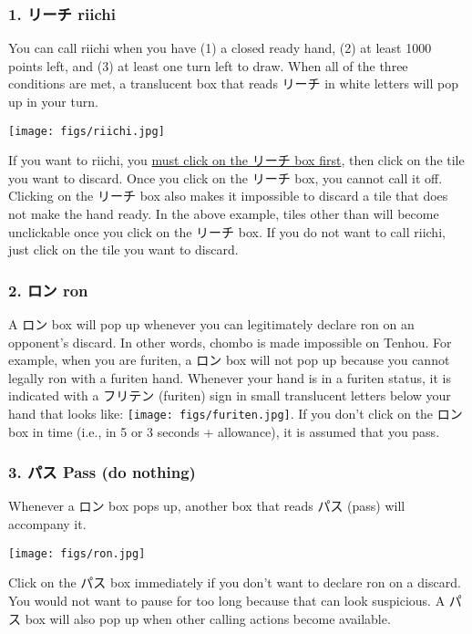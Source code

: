 \subsubsection{1. リーチ riichi } 
You can call riichi when you have (1) a closed ready hand, (2) at least 1000 points left, and (3) at least one turn left to draw. When all of the three conditions are met, a translucent box that reads リーチ in white letters will pop up in your turn. 
\begin{center}
\texttt{[image: figs/riichi.jpg]}
\end{center}
If you want to riichi, you \underline{must click on the リーチ box first}, then click on the tile you want to discard. Once you click on the リーチ box, you cannot call it off. Clicking on the リーチ box also makes it impossible to discard a tile that does not make the hand ready. In the above example, tiles other than {\LARGE {}} will become unclickable once you click on the リーチ box. If you do not want to call riichi, just click on the tile you want to discard. 

\subsubsection{2. ロン {\jap ron} \textipa{[r\'\textopeno\ng]}}
A ロン box will pop up whenever you can legitimately declare {\jap ron} on an opponent's discard. In other words, {\jap chombo} is made impossible on {\jap Tenhou}. For example, when you are {\jap furiten}, a ロン box will not pop up because you cannot legally {\jap ron} with a {\jap furiten} hand. Whenever your hand is in a {\jap furiten} status, it is indicated with a フリテン ({\jap furiten}) sign in small translucent letters below your hand that looks like: \texttt{[image: figs/furiten.jpg]}.
If you don't click on the ロン box in time (i.e., in 5 or 3 seconds + allowance), it is assumed that you pass. 

\subsubsection{3. パス Pass (do nothing)}
Whenever a ロン box pops up, another box that reads パス (pass) will accompany it. 
\begin{center}
\texttt{[image: figs/ron.jpg]}
\end{center}
Click on the パス box immediately if you don't want to declare {\jap ron} on a discard. You would not want to pause for too long because that can look suspicious. A パス box will also pop up when other calling actions become available. 

